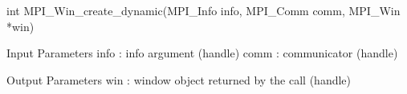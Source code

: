 int MPI_Win_create_dynamic(MPI_Info info, MPI_Comm comm, MPI_Win *win)

Input Parameters
info : info argument (handle)
comm : communicator (handle)

Output Parameters
win : window object returned by the call (handle)
